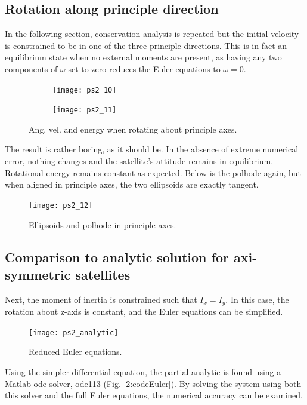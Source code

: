 \documentclass[12pt, letterpaper]{article}
\begin{document}
\subsection{Rotation along principle direction}

In the following section, conservation analysis is repeated but the initial velocity is constrained to be in one of the three principle directions. This is in fact an equilibrium state when no external moments are present, as having any two components of $\omega$ set to zero reduces the Euler equations to $\dot{\omega}=0$.

\begin{figure}[H]
	\centering
	\begin{subfigure}[b]{0.49\textwidth}
		\texttt{[image: ps2\_10]}
	\end{subfigure}
	\begin{subfigure}[b]{0.49\textwidth}
		\texttt{[image: ps2\_11]}
	\end{subfigure}
	\caption{Ang. vel. and energy when rotating about principle axes.}
	\label{(2:angVel2)}
\end{figure}

The result is rather boring, as it should be. In the absence of extreme numerical error, nothing changes and the satellite's attitude remains in equilibrium. Rotational energy remains constant as expected. Below is the polhode again, but when aligned in principle axes, the two ellipsoids are exactly tangent.

\begin{figure}[H]
	\centering
	\texttt{[image: ps2\_12]}
	\caption{Ellipsoids and polhode in principle axes.}
	\label{2:polhode2}
\end{figure}

\subsection{Comparison to analytic solution for axi-symmetric satellites}

Next, the moment of inertia is constrained such that $I_x=I_y$. In this case, the rotation about z-axis is constant, and the Euler equations can be simplified.

\begin{figure}[H]
	\centering
	\texttt{[image: ps2\_analytic]}
	\caption{Reduced Euler equations.}
	\label{2:reducedEuler}
\end{figure}

Using the simpler differential equation, the partial-analytic is found using a Matlab ode solver, ode113 (Fig. \ref{2:codeEuler}). By solving the system using both this solver and the full Euler equations, the numerical accuracy can be examined.
\end{document}
